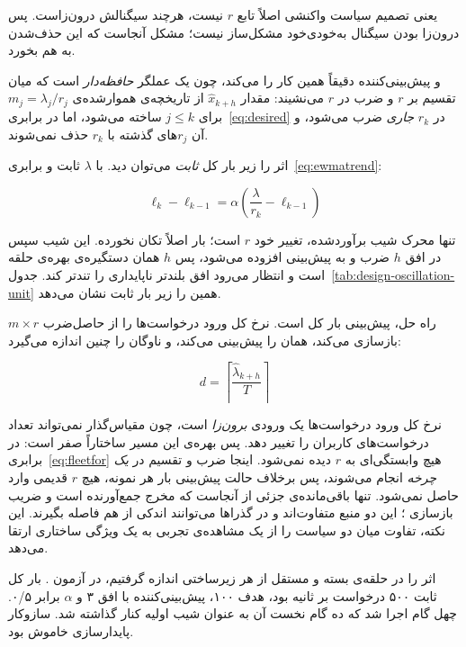 یعنی تصمیم سیاست واکنشی اصلاً تابع $r$ نیست، هرچند سیگنالش درون‌زاست. پس درون‌زا بودن سیگنال
به‌خودی‌خود مشکل‌ساز نیست؛ مشکل آنجاست که این حذف‌شدن به هم بخورد.

و پیش‌بینی‌کننده دقیقاً همین کار را می‌کند، چون یک عملگر \emph{حافظه‌دار} است که میان تقسیم
بر $r$ و ضرب در $r$ می‌نشیند: مقدار $\hat{x}_{k+h}$ از تاریخچه‌ی هموارشده‌ی
$m_j = \lambda_j / r_j$ برای $j \le k$ ساخته می‌شود، اما در برابری~\ref{eq:desired} در
$r_k$ \emph{جاری} ضرب می‌شود، و آن $r_j$های گذشته با $r_k$ حذف نمی‌شوند.

اثر را زیر بار کل \emph{ثابت} می‌توان دید. با $\lambda$ ثابت و برابری~\ref{eq:ewmatrend}:

\begin{equation}
\label{eq:gain}
\ell_k - \ell_{k-1} = \alpha\left( \frac{\lambda}{r_k} - \ell_{k-1} \right)
\end{equation}

تنها محرک شیب برآوردشده، تغییر خود $r$ است؛ بار اصلاً تکان نخورده. این شیب سپس در افق $h$
ضرب و به پیش‌بینی افزوده می‌شود، پس $h$ همان دستگیره‌ی بهره‌ی حلقه است و انتظار می‌رود افق
بلندتر ناپایداری را تندتر کند. جدول~\ref{tab:design-oscillation-unit} همین را زیر بار ثابت
نشان می‌دهد.

راه حل، پیش‌بینی بار کل است.  نرخ کل ورود درخواست‌ها را از حاصل‌ضرب
$m \times r$ بازسازی می‌کند، همان را پیش‌بینی می‌کند، و ناوگان را چنین اندازه می‌گیرد:

\begin{equation}
\label{eq:fleetfor}
d = \left\lceil \frac{\hat{\lambda}_{k+h}}{T} \right\rceil
\end{equation}

نرخ کل ورود درخواست‌ها یک ورودی \emph{برون‌زا} است، چون مقیاس‌گذار نمی‌تواند تعداد درخواست‌های
کاربران را تغییر دهد. پس بهره‌ی این مسیر ساختاراً صفر است: در
برابری~\ref{eq:fleetfor} هیچ وابستگی‌ای به $r$ دیده نمی‌شود. اینجا ضرب و تقسیم در
\emph{یک چرخه} انجام می‌شوند، پس برخلاف حالت پیش‌بینی بار هر نمونه، هیچ $r$ قدیمی وارد
حاصل نمی‌شود. تنها باقی‌مانده‌ی جزئی از آنجاست که مخرج جمع‌آورنده  است و
ضریب بازسازی ؛ این دو منبع متفاوت‌اند و در گذراها می‌توانند
اندکی از هم فاصله بگیرند. این نکته، تفاوت میان دو سیاست را از یک مشاهده‌ی تجربی به یک ویژگی
ساختاری ارتقا می‌دهد.

اثر را در حلقه‌ی بسته و مستقل از هر زیرساختی اندازه گرفتیم، در آزمون
. بار کل ثابت ۵۰۰ درخواست بر ثانیه
بود، هدف ۱۰۰، پیش‌بینی‌کننده  با افق ۳ و $\alpha$ برابر ۰/۵. چهل گام اجرا شد که ده
گام نخست آن به عنوان شیب اولیه کنار گذاشته شد. سازوکار پایدارسازی خاموش بود.

